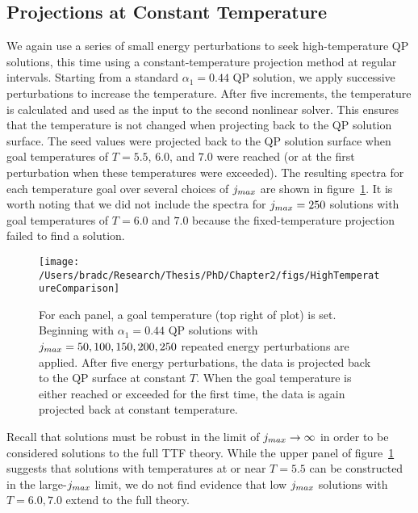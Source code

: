 \documentclass[../PhD.tex]{subfiles}
\begin{document}

\subsection{Projections at Constant Temperature}
\label{ssec: T projections}

We again use a series of small energy perturbations to seek high-temperature QP solutions, this time using a constant-temperature projection method at regular intervals. Starting from a standard $\alpha_1 = 0.44$ QP solution, we apply successive perturbations to increase the temperature. After five increments, the temperature is calculated and used as the input to the second nonlinear solver. This ensures that the temperature is not changed when projecting back to the QP solution surface. The seed values were projected back to the QP solution surface when goal temperatures of $T=5.5$, $6.0$, and $7.0$ were reached (or at the first perturbation when these temperatures were exceeded). The resulting spectra for each temperature goal over several choices of $j_{max}$ are shown in figure~\ref{fig: const T perturbs}. It is worth noting that we did not include the spectra for $j_{max} = 250$ solutions with goal temperatures of $T=6.0$ and $7.0$ because the fixed-temperature projection failed to find a solution.

\begin{figure}[tp!]
	\centering
		\texttt{[image: /Users/bradc/Research/Thesis/PhD/Chapter2/figs/HighTemperatureComparison]}
		\caption[Finding high temperature QP solutions using repeated perturbations with regular projections back to the QP surface]{For each panel, a goal temperature (top right of plot) is set. Beginning with $\alpha_1 = 0.44$ QP solutions with ${j_{max} = 50, 100, 150, 200, 250}$ repeated energy perturbations are applied. After five energy perturbations, the data is projected back to the QP surface at constant $T$. When the goal temperature is either reached or exceeded for the first time, the data is again projected back at constant temperature.}
		\label{fig: const T perturbs}
\end{figure}

Recall that solutions must be robust in the limit of $j_{max} \to \infty$ in order to be considered solutions to the full TTF theory. While the upper panel of figure~\ref{fig: const T perturbs} suggests that solutions with temperatures at or near $T=5.5$ can be constructed in the large-$j_{max}$ limit, we do not find evidence that low $j_{max}$ solutions with $T=6.0, 7.0$ extend to the full theory.
\end{document}
